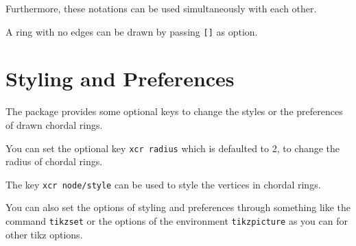 \documentclass{article}
\begin{document}
\begin{LTXexample}[pos=r]
\end{LTXexample}

Furthermore, these notations can be used simultaneously with each other.

\begin{LTXexample}[pos=r]
\end{LTXexample}

A ring with no edges can be drawn by passing \lstinline{[]} as option.

\begin{LTXexample}[pos=r]
\end{LTXexample}

\section{Styling and Preferences}

The package provides some optional keys to change the styles or the preferences of drawn chordal rings.

You can set the optional key \lstinline{xcr radius} which is defaulted to 2, to change the radius of
chordal rings.

\begin{LTXexample}[pos=r]
\end{LTXexample}

The key \lstinline{xcr node/style} can be used to style the vertices in chordal rings.

\begin{LTXexample}[pos=r]
\end{LTXexample}

You can also set the options of styling and preferences through something like the command \lstinline{tikzset} or the options of the environment \lstinline{tikzpicture} as you can for other tikz options.


\begin{LTXexample}[pos=r]
\tikzset{xcr radius=15mm}

\end{LTXexample}

\begin{LTXexample}[pos=r]
\end{LTXexample}
\end{document}
